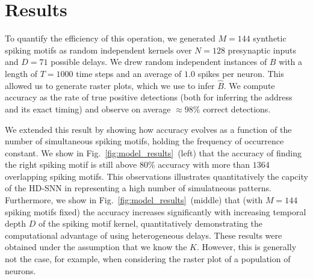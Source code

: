 \documentclass[runningheads]{llncs}
\newcommand{\presynaddr}{a} %
\newcommand{\postsynaddr}{b} %
\newcommand{\arank}{r} %
\newcommand{\bias}{b} %
\newcommand{\synapse}{\mathcal{S}} %
\newcommand{\activeweights}{\mathcal{W}}
\newcommand{\timev}{t} %
\newcommand{\Nclass}{N_\text{class}} %
\newcommand{\kernel}{K} %
\newcommand{\Nspeed}{N_v}
\newcommand{\fig}[1]{Fig.~\ref{fig:#1}}%
\begin{document}
%
%
%
\section{Results}
%
To quantify the efficiency of this operation, we generated $M=144$ synthetic spiking motifs as random independent kernels over $N=128$ presynaptic inputs and $D=71$ possible delays. We drew random independent instances of $B$ with a length of $T=1000$ time steps and an average of $1.0$ spikes per neuron. This allowed us to generate raster plots, which we use to infer $\hat{B}$. We compute accuracy as the rate of true positive detections (both for inferring the address and its exact timing) and observe on average $\approx 98\%$ correct detections.

We extended this result by showing how accuracy evolves as a function of the number of simultaneous spiking motifs, holding the frequency of occurrence constant. We show in \fig{model_results}~(left) that the accuracy of finding the right spiking motif is still above $80\%$ accuracy with more than $1364$ overlapping spiking motifs. This observations illustrates quantitatively the capcity  of the HD-SNN in representing a high number of simulatneous patterns. Furthermore, we show in \fig{model_results}~(middle) that (with $M=144$ spiking motifs fixed) the accuracy increases significantly with increasing temporal depth $D$ of the spiking motif kernel, quantitatively demonstrating the computational advantage of using heterogeneous delays. These results were obtained under the assumption that we know the $\kernel$. However, this is generally not the case, for example, when considering the raster plot of a population of neurons.
\end{document}
